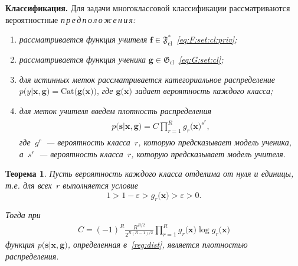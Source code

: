 \documentclass{dissert}
\newcommand{\paragraph}[1]{\noindent\textbf{#1}\quad}
\newtheorem{theorem}{Теорема}
\begin{document}
\paragraph{Классификация.} Для задачи многоклассовой классификации рассматриваются вероятностные 
{\sl{п\,р\,е\,д\,п\,о\,л\,о\,ж\,е\,н\,и\,я:}}
\begin{enumerate}[1)]
\label{st:class:1}
	\item \emph{рассматривается функция учителя} $\mathbf{f}\in\mathfrak{F}_{\text{cl}}^{*}$~\emph{\eqref{eq:F:set:cl:priv};}
	\item \emph{рассматривается функция ученика}   $\mathbf{g}\in\mathfrak{G}_{\text{cl}}$~\emph{\eqref{eq:G:set:cl};}
	\item \emph{для истинных меток рассматривается категориальное распределение}~$p\bigr(y|\mathbf{x}, \mathbf{g}\bigr) = \text{Cat}\bigr(\mathbf{g}\bigr(\mathbf{x}\bigr)\bigr)$, \emph{где $\mathbf{g}\bigr(\mathbf{x}\bigr)$ задает вероятность каждого класса;}
	\item \emph{для меток учителя введем плотность распределения}
\begin{gather}
\label{reg:dist}
\begin{aligned}
	p\bigr(\mathbf{s}|\mathbf{x}, \mathbf{g}\bigr) = C\prod_{r=1}^{R}g_r\bigr(\mathbf{x}\bigr)^{s^r},
\end{aligned}
\end{gather}
\emph{где~$g^r$~--- вероятность класса~$r$, которую предсказывает модель ученика, а~$s^r$~--- вероятность класса~$r$, которую предсказывает модель учителя.}
\end{enumerate}
\begin{theorem}
\label{theorem:st:dist}
Пусть вероятность каждого класса отделима от нуля и единицы, т.е. для всех~$r$ выполняется условие
\[1 > 1- \varepsilon > g_r\bigr(\mathbf{x}\bigr) > \varepsilon > 0.
\]

Тогда при
\begin{gather}
C=\left(-1\right)^{R}\frac{R^{R/2}}{2^{R(R-1)/2}}\prod_{r=1}^{R}g_r\bigr(\mathbf{x}\bigr)\log g_r\bigr(\mathbf{x}\bigr)
\end{gather}
функция $p\bigr(\mathbf{s}|\mathbf{x}, \mathbf{g}\bigr)$, определенная в~\eqref{reg:dist}, является плотностью распределения.
\end{theorem}
\end{document}
